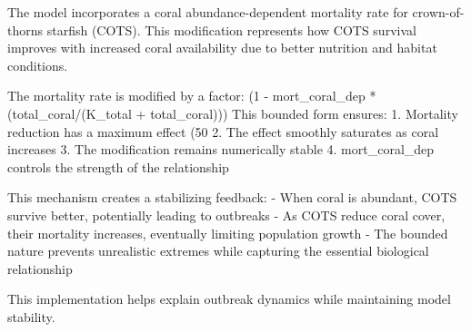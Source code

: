 The model incorporates a coral abundance-dependent mortality rate for crown-of-thorns starfish (COTS). This modification represents how COTS survival improves with increased coral availability due to better nutrition and habitat conditions.

The mortality rate is modified by a factor: (1 - mort_coral_dep * (total_coral/(K_total + total_coral)))
This bounded form ensures:
1. Mortality reduction has a maximum effect (50%
2. The effect smoothly saturates as coral increases
3. The modification remains numerically stable
4. mort_coral_dep controls the strength of the relationship

This mechanism creates a stabilizing feedback:
- When coral is abundant, COTS survive better, potentially leading to outbreaks
- As COTS reduce coral cover, their mortality increases, eventually limiting population growth
- The bounded nature prevents unrealistic extremes while capturing the essential biological relationship

This implementation helps explain outbreak dynamics while maintaining model stability.
